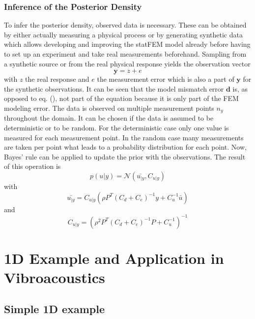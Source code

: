 \documentclass[%
  a4paper,oneside,%
  11pt,%
  smallchapters,
  green,%
  rgb, <cmyk>
  ,]{tubsbook}
\begin{document}
\subsection{Inference of the Posterior Density}
To infer the posterior density, observed data is necessary. These can be obtained by either actually measuring a physical process or by generating synthetic data which allows developing and improving the statFEM model already before having to set up an experiment and take real measurements beforehand.
%
Sampling from a synthetic source or from the real physical response yields the observation vector
%
\begin{equation}
\bm{y} = {z} + {e}
\end{equation}
%
with $z$ the real response and $e$ the measurement error which is also a part of $\bm{y}$ for the synthetic observations. It can be seen that the model mismatch error $\bm{d}$ is, as opposed to eq. (), not part of the equation because it is only part of the FEM modeling error. 
%
The data is observed on multiple measurement  points $n_y$ throughout the domain. It can be chosen if the data is assumed to be deterministic or to be random. For the deterministic case only one value is measured for each measurement point. In the random case many measurements are taken per point what leads to a probability distribution for each point.
%
Now, Bayes' rule can be applied to update the prior with the observations.
The result of this operation is
%
\begin{equation}
p(u|y) = \mathcal{N}(\bar{u_{|y}}, C_{u|y})
\end{equation}
%
with
%
\begin{equation}
\bar{u_{|y}} = C_{u|y} \left(   \rho P^T  (C_d + C_e)^{-1}  y  +  C_u^{-1}  \bar{u}   \right)
\end{equation}
and
\begin{equation}
C_{u|y} = \left(      \rho^2  P^T   (C_d + C_e)^{-1}  P  +  C_u^{-1}    \right)^{-1}
\end{equation}





\chapter{1D Example and Application in Vibroacoustics}

\section{Simple 1D example}
\end{document}
